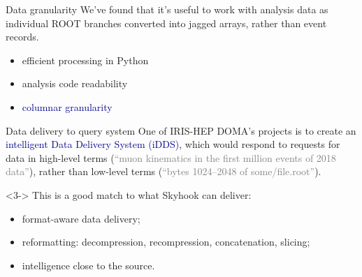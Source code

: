 \documentclass[aspectratio=169]{beamer}
\begin{document}
\begin{frame}{Data granularity}
\large
\vspace{0.5 cm}
We've found that it's useful to work with analysis data as individual ROOT branches converted into jagged arrays, rather than event records.
\begin{itemize}
\item efficient processing in Python
\item analysis code readability
\item \textcolor{darkblue}{columnar granularity}
\end{itemize}

\vspace{0.5 cm}

\vspace{0.5 cm}

\vspace{0.5 cm}
\end{frame}

\begin{frame}{Data delivery to query system}
\large
\vspace{0.5 cm}
One of IRIS-HEP DOMA's projects is to create an \textcolor{darkblue}{intelligent Data Delivery System (iDDS)}, which would respond to requests for data in high-level terms (\textcolor{gray}{``muon kinematics in the first million events of 2018 data''}), rather than low-level terms (\textcolor{gray}{``bytes 1024--2048 of some/file.root''}).

\vspace{0.5 cm}

\vspace{0.5 cm}
\begin{uncoverenv}<3->
This is a good match to what Skyhook can deliver:
\begin{itemize}
\item format-aware data delivery;
\item reformatting: decompression, recompression, concatenation, slicing;
\item intelligence close to the source.
\end{itemize}
\end{uncoverenv}
\end{frame}
\end{document}
